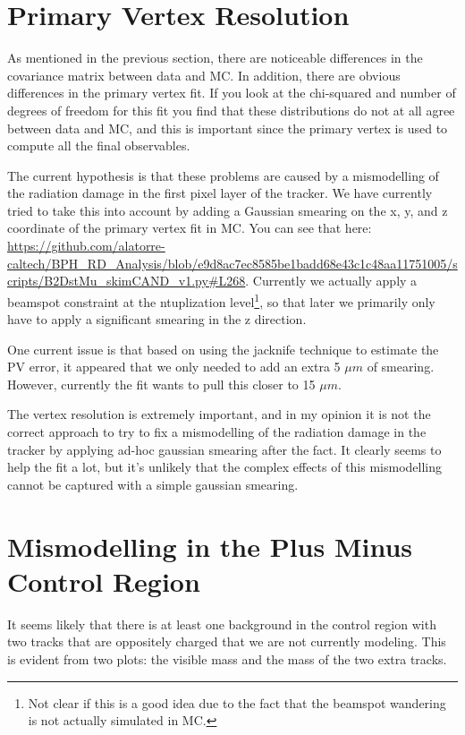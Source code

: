 \documentclass[12pt]{report}
\begin{document}
\section{Primary Vertex Resolution}
As mentioned in the previous section, there are noticeable differences in the
covariance matrix between data and MC. In addition, there are obvious
differences in the primary vertex fit. If you look at the chi-squared and
number of degrees of freedom for this fit you find that these distributions do
not at all agree between data and MC, and this is important since the primary
vertex is used to compute all the final observables.

The current hypothesis is that these problems are caused by a mismodelling of
the radiation damage in the first pixel layer of the tracker. We have currently
tried to take this into account by adding a Gaussian smearing on the x, y, and
z coordinate of the primary vertex fit in MC. You can see that here:
\url{https://github.com/alatorre-caltech/BPH_RD_Analysis/blob/e9d8ac7ec8585be1badd68e43c1c48aa11751005/scripts/B2DstMu_skimCAND_v1.py#L268}.
Currently we actually apply a beamspot constraint at the ntuplization
level\footnote{Not clear if this is a good idea due to the fact that the
beamspot wandering is not actually simulated in MC.}, so that later we
primarily only have to apply a significant smearing in the z direction.

One current issue is that based on using the jacknife technique to estimate the
PV error, it appeared that we only needed to add an extra 5 $\mu m$ of
smearing. However, currently the fit wants to pull this closer to 15 $\mu m$.

The vertex resolution is extremely important, and in my opinion it is not the
correct approach to try to fix a mismodelling of the radiation damage in the
tracker by applying ad-hoc gaussian smearing after the fact. It clearly seems
to help the fit a lot, but it's unlikely that the complex effects of this
mismodelling cannot be captured with a simple gaussian smearing.

\section{Mismodelling in the Plus Minus Control Region}
It seems likely that there is at least one background in the control region
with two tracks that are oppositely charged that we are not currently modeling.
This is evident from two plots: the visible mass and the mass of the two extra
tracks.
\end{document}
